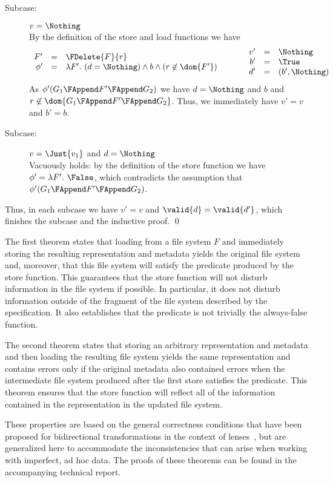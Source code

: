 {\begin{description}
\begin{description}
\item[Subcase:] $v = \Nothing$\\[1ex]
%
By the definition of the store and load functions we have
\[
\begin{array}{rcl}
F' &=& \FDelete{F}{r}\\
\phi' &=& \lambda F'.~(d = \Nothing) \wedge b \wedge (r \not\in \dom{F'})\\
\end{array}\hspace*{1cm}\begin{array}{rcl}
v' &=& \Nothing\\
b' &=& \True\\
d' &=& (b',\Nothing)\\
\end{array}
\]
As $\phi'(G_1 \FAppend F' \FAppend G_2)$ we have $d
= \Nothing$ and $b$ and $r \not\in \dom{G_1 \FAppend F' \FAppend
  G_2}$. Thus, we immediately have $v' = v$ and $b' = b$. 
\item[Subcase:] $v = \Just{v_1}$ and $d = \Nothing$\\[1ex]
%
Vacuously holds: by the definition of the store function we have
$\phi' = \lambda F'.~\False$, which contradicts the assumption that
$\phi'(G_1 \FAppend F' \FAppend G_2)$.
\end{description}
Thus, in each subcase we have $v' = v$ and $\valid{d} = \valid{d'}$,
which finishes the subcase and the inductive proof. \hfill \qed
\end{description}}

\smallskip

\noindent The first theorem states that loading from a file system $F$
and immediately storing the resulting representation and metadata
yields the original file system and, moreover, that this file system
will satisfy the predicate produced by the store function. This
guarantees that the store function will not disturb information in the
file system if possible. In particular, it does not disturb
information outside of the fragment of the file system described by
the specification. It also establishes that the predicate is not
trivially the always-false function.

The second theorem states that storing an arbitrary representation and
metadata and then loading the resulting file system yields the same
representation and contains errors only if the original metadata also
contained errors when the intermediate file system produced after the
first store satisfies the predicate. This theorem ensures that the
store function will reflect all of the information contained in the
representation in the updated file system.

These properties are based on the general correctness conditions that
have been proposed for bidirectional transformations in the context of
lenses~\cite{lenses}, but are generalized here to accommodate the
inconsistencies that can arise when working with imperfect, ad hoc
data. The proofs of these theorems can be found in the accompanying
technical report.

